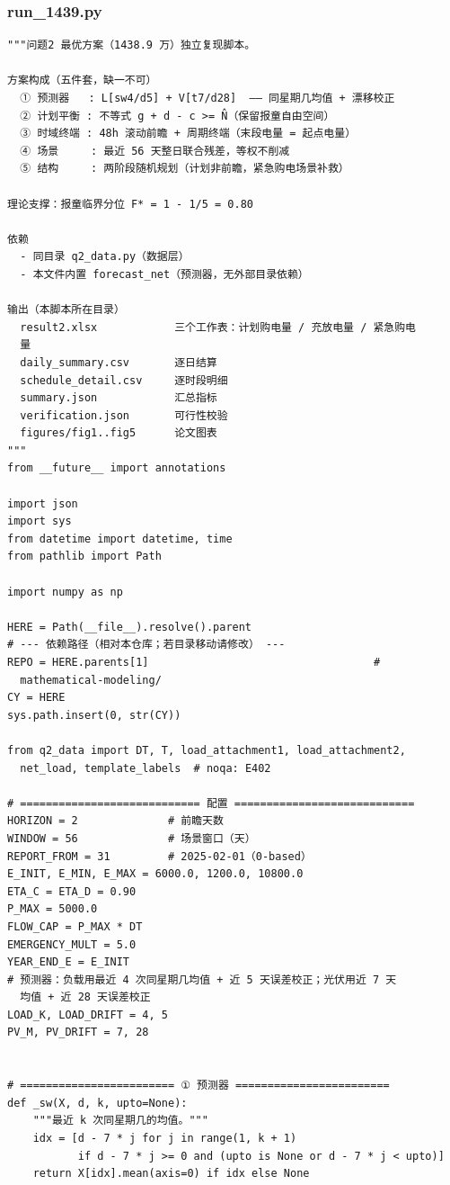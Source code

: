 \subsubsection*{run\_1439.py}
\begin{verbatim}
"""问题2 最优方案（1438.9 万）独立复现脚本。

方案构成（五件套，缺一不可）
  ① 预测器   : L[sw4/d5] + V[t7/d28]  —— 同星期几均值 + 漂移校正
  ② 计划平衡 : 不等式 g + d - c >= N̂（保留报童自由空间）
  ③ 时域终端 : 48h 滚动前瞻 + 周期终端（末段电量 = 起点电量）
  ④ 场景     : 最近 56 天整日联合残差，等权不削减
  ⑤ 结构     : 两阶段随机规划（计划非前瞻，紧急购电场景补救）

理论支撑：报童临界分位 F* = 1 - 1/5 = 0.80

依赖
  - 同目录 q2_data.py（数据层）
  - 本文件内置 forecast_net（预测器，无外部目录依赖）

输出（本脚本所在目录）
  result2.xlsx            三个工作表：计划购电量 / 充放电量 / 紧急购电
  量
  daily_summary.csv       逐日结算
  schedule_detail.csv     逐时段明细
  summary.json            汇总指标
  verification.json       可行性校验
  figures/fig1..fig5      论文图表
"""
from __future__ import annotations

import json
import sys
from datetime import datetime, time
from pathlib import Path

import numpy as np

HERE = Path(__file__).resolve().parent
# --- 依赖路径（相对本仓库；若目录移动请修改） ---
REPO = HERE.parents[1]                                   #
  mathematical-modeling/
CY = HERE
sys.path.insert(0, str(CY))

from q2_data import DT, T, load_attachment1, load_attachment2,
  net_load, template_labels  # noqa: E402

# ============================ 配置 ============================
HORIZON = 2              # 前瞻天数
WINDOW = 56              # 场景窗口（天）
REPORT_FROM = 31         # 2025-02-01（0-based）
E_INIT, E_MIN, E_MAX = 6000.0, 1200.0, 10800.0
ETA_C = ETA_D = 0.90
P_MAX = 5000.0
FLOW_CAP = P_MAX * DT
EMERGENCY_MULT = 5.0
YEAR_END_E = E_INIT
# 预测器：负载用最近 4 次同星期几均值 + 近 5 天误差校正；光伏用近 7 天
  均值 + 近 28 天误差校正
LOAD_K, LOAD_DRIFT = 4, 5
PV_M, PV_DRIFT = 7, 28


# ======================== ① 预测器 ========================
def _sw(X, d, k, upto=None):
    """最近 k 次同星期几的均值。"""
    idx = [d - 7 * j for j in range(1, k + 1)
           if d - 7 * j >= 0 and (upto is None or d - 7 * j < upto)]
    return X[idx].mean(axis=0) if idx else None



\end{verbatim}
